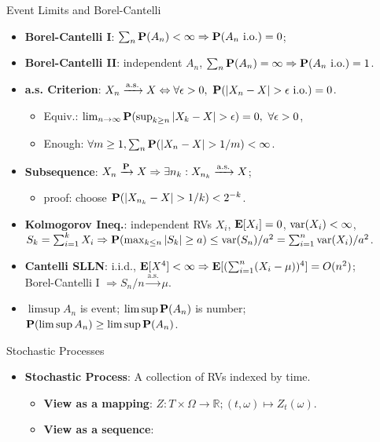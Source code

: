 \documentclass[landscape,a4paper]{article}
\begin{document}
\begin{cheatsheetcolumns}
\begin{card}{Event Limits and Borel-Cantelli}
\begin{itemize}
\begin{itemize}
				\end{itemize}
				\item \textbf{Borel-Cantelli I}: $\sum_n\mathbf{P}(A_n)<\infty\Rightarrow\mathbf{P}(A_n\text{ i.o.})=0$;
				\item \textbf{Borel-Cantelli II}: independent $A_n$, $\sum_n\mathbf{P}(A_n)=\infty\Rightarrow\mathbf{P}(A_n\text{ i.o.})=1$.
				\item \textbf{a.s. Criterion}: $X_n\xrightarrow{\mathrm{a.s.}}X\Leftrightarrow\forall\epsilon>0,\ \PP(|X_n-X|>\epsilon\text{ i.o.})=0$.
				\begin{itemize}
					\item Equiv.: $\lim_{n\to\infty}\PP(\sup_{k\ge n}|X_k-X|>\epsilon)=0,\ \forall\epsilon>0$,
					\item Enough: $\forall m\ge1,\sum_n\PP(|X_n-X|>1/m)<\infty$.
				\end{itemize}
				\item \textbf{Subsequence}: $X_n\xrightarrow{\mathbf{P}}X\Rightarrow\exists n_k:X_{n_k}\xrightarrow{\mathrm{a.s.}}X$; 
				\begin{itemize}
					\item proof: choose $\PP(|X_{n_k}-X|>1/k)<2^{-k}$.
				\end{itemize}
				\item \textbf{Kolmogorov Ineq.}: independent RVs $X_i$, $\mathbf{E}[X_i]=0$, $\operatorname{var}(X_i)<\infty$, $S_k=\sum_{i=1}^kX_i\Rightarrow \mathbf{P}(\max_{k\le n}|S_k|\ge a)\le\operatorname{var}(S_n)/a^2=\sum_{i=1}^n \operatorname{var}(X_i)/a^2$.
				\item \textbf{Cantelli SLLN}: i.i.d., $\mathbf{E}[X^4]<\infty\Rightarrow \mathbf{E}[(\sum_{i=1}^n(X_i-\mu))^4]=O(n^2)$;\\Borel-Cantelli I $\Rightarrow S_n/n\xrightarrow{\mathrm{a.s.}}\mu$.
				\item $\limsup A_n$ is event; $\limsup\mathbf{P}(A_n)$ is number;\\$\mathbf{P}(\limsup A_n)\ge\limsup\mathbf{P}(A_n)$.
			\end{itemize}
		\end{card}
		\begin{card}{Stochastic Processes}
			\begin{itemize}
				\item \textbf{Stochastic Process}: A collection of RVs indexed by time.
				\begin{itemize}
					\item \textbf{View as a mapping}: $Z\colon T\times \Omega \to \mathbb{R}; \left(t, \omega\right)\mapsto Z_t(\omega)$.
					\item \textbf{View as a sequence}:

\end{itemize}
\end{itemize}
\end{card}
\end{cheatsheetcolumns}
\end{document}
